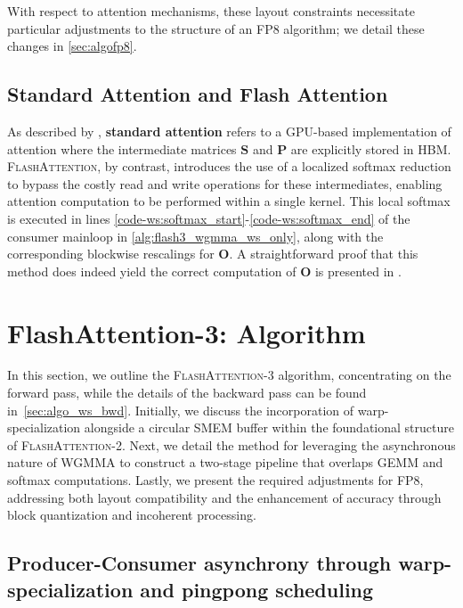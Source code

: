 With respect to attention mechanisms, these layout constraints necessitate particular adjustments to the structure of an FP8 algorithm; we detail these changes in \cref{sec:algofp8}.

\subsection{Standard Attention and Flash Attention} As described by \citet{dao2022flashattention}, \textbf{standard attention} refers to a GPU-based implementation of attention where the intermediate matrices $\mathbf{S}$ and $\mathbf{P}$ are explicitly stored in HBM. \textsc{FlashAttention}, by contrast, introduces the use of a localized softmax reduction to bypass the costly read and write operations for these intermediates, enabling attention computation to be performed within a single kernel. This local softmax is executed in lines \ref{code-ws:softmax_start}-\ref{code-ws:softmax_end} of the consumer mainloop in \cref{alg:flash3_wgmma_ws_only}, along with the corresponding blockwise rescalings for $\mathbf{O}$. A straightforward proof that this method does indeed yield the correct computation of $\mathbf{O}$ is presented in \cite[\S 2.3.1]{dao2023flashattention2}.

\section{FlashAttention-3: Algorithm}
\label{sec:algo}

In this section, we outline the \textsc{FlashAttention-3} algorithm, concentrating on the forward pass, while the details of the backward pass can be found in~\cref{sec:algo_ws_bwd}. Initially, we discuss the incorporation of warp-specialization alongside a circular SMEM buffer within the foundational structure of \textsc{FlashAttention-2}. Next, we detail the method for leveraging the asynchronous nature of WGMMA to construct a two-stage pipeline that overlaps GEMM and softmax computations. Lastly, we present the required adjustments for FP8, addressing both layout compatibility and the enhancement of accuracy through block quantization and incoherent processing.

\subsection{Producer-Consumer asynchrony through warp-specialization and pingpong scheduling}
\label{sec:algo_ws}


